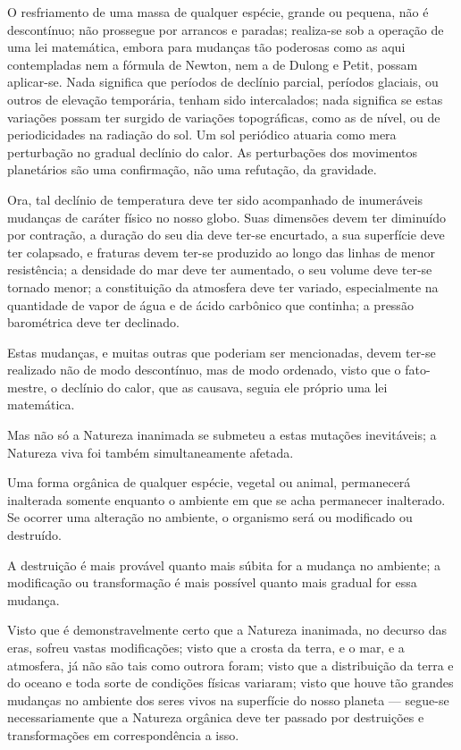 \documentclass[11pt,a5paper,twoside,openany]{book}
\begin{document}
O resfriamento de uma massa de qualquer espécie, grande ou pequena, não é descontínuo; não prossegue por arrancos e paradas; realiza-se sob a operação de uma lei matemática, embora para mudanças tão poderosas como as aqui contempladas nem a fórmula de Newton, nem a de Dulong e Petit, possam aplicar-se. Nada significa que períodos de declínio parcial, períodos glaciais, ou outros de elevação temporária, tenham sido intercalados; nada significa se estas variações possam ter surgido de variações topográficas, como as de nível, ou de periodicidades na radiação do sol. Um sol periódico atuaria como mera perturbação no gradual declínio do calor. As perturbações dos movimentos planetários são uma confirmação, não uma refutação, da gravidade.

Ora, tal declínio de temperatura deve ter sido acompanhado de inumeráveis mudanças de caráter físico no nosso globo. Suas dimensões devem ter diminuído por contração, a duração do seu dia deve ter-se encurtado, a sua superfície deve ter colapsado, e fraturas devem ter-se produzido ao longo das linhas de menor resistência; a densidade do mar deve ter aumentado, o seu volume deve ter-se tornado menor; a constituição da atmosfera deve ter variado, especialmente na quantidade de vapor de água e de ácido carbônico que continha; a pressão barométrica deve ter declinado.

Estas mudanças, e muitas outras que poderiam ser mencionadas, devem ter-se realizado não de modo descontínuo, mas de modo ordenado, visto que o fato-mestre, o declínio do calor, que as causava, seguia ele próprio uma lei matemática.

Mas não só a Natureza inanimada se submeteu a estas mutações inevitáveis; a Natureza viva foi também simultaneamente afetada.

Uma forma orgânica de qualquer espécie, vegetal ou animal, permanecerá inalterada somente enquanto o ambiente em que se acha permanecer inalterado. Se ocorrer uma alteração no ambiente, o organismo será ou modificado ou destruído.

A destruição é mais provável quanto mais súbita for a mudança no ambiente; a modificação ou transformação é mais possível quanto mais gradual for essa mudança.

Visto que é demonstravelmente certo que a Natureza inanimada, no decurso das eras, sofreu vastas modificações; visto que a crosta da terra, e o mar, e a atmosfera, já não são tais como outrora foram; visto que a distribuição da terra e do oceano e toda sorte de condições físicas variaram; visto que houve tão grandes mudanças no ambiente dos seres vivos na superfície do nosso planeta — segue-se necessariamente que a Natureza orgânica deve ter passado por destruições e transformações em correspondência a isso.
\end{document}
